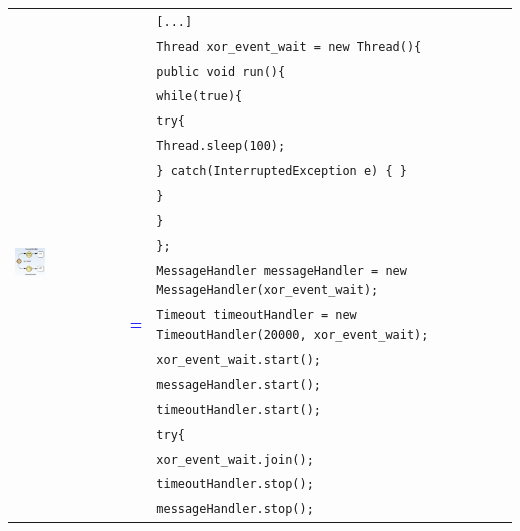 \begin{tabularx}{\linewidth}{lcX}
	\multirow{26}{*}{\includegraphics[width=0.3\textwidth]{images/mapping/xor-event.png}} &  & \texttt{[...]}\\
	& & \texttt{Thread xor\_event\_wait = new Thread()\{}\\
	& & \texttt{\hspace{10pt}public void run()\{}\\
	& & \texttt{\hspace{20pt}while(true)\{}\\
	& & \texttt{\hspace{30pt}try\{}\\
	& & \texttt{\hspace{40pt}Thread.sleep(100);}\\
	& & \texttt{\hspace{30pt}\} catch(InterruptedException e) \{ \}}\\
	& & \texttt{\hspace{20pt}\}}\\
	& & \texttt{\hspace{10pt}\}}\\
	& & \texttt{\};}\\
	& & \texttt{MessageHandler messageHandler = new MessageHandler(xor\_event\_wait);}\\
	& \textbf{\textcolor{blue}{=}} & \texttt{Timeout timeoutHandler = new TimeoutHandler(20000, xor\_event\_wait);}\\
	& & \texttt{xor\_event\_wait.start();}\\
	& & \texttt{messageHandler.start();}\\
	& & \texttt{timeoutHandler.start();}\\
	& & \texttt{try\{}\\
	& & \texttt{\hspace{10pt}xor\_event\_wait.join();}\\
	& & \texttt{\hspace{10pt}timeoutHandler.stop();}\\
	& & \texttt{\hspace{10pt}messageHandler.stop();}\\

\end{tabularx}
